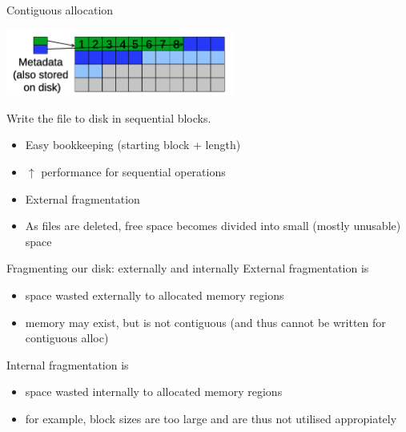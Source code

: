 \documentclass[journal, letterpaper]{IEEEtran}
\begin{document}
\begin{theory}{Contiguous allocation}
    \begin{center}
        \includegraphics[width=7.5cm]{./photos/contig_alloc.png}
    \end{center}
    Write the file to disk in sequential blocks.
    \begin{itemize}
        \item[\ding{51}] Easy bookkeeping (starting block + length)
        \item[\ding{51}] $\uparrow$ performance for sequential operations
        \item[\ding{55}] External fragmentation
        \item[\ding{55}] As files are deleted, free space becomes divided into small (mostly unusable) space
    \end{itemize}
\end{theory}
\begin{aside}{Fragmenting our disk: externally and internally}
    External fragmentation is
    \begin{itemize}
        \item space wasted externally to allocated memory regions
        \item memory may exist, but is not contiguous (and thus cannot be written for contiguous alloc)
    \end{itemize}
    Internal fragmentation is
    \begin{itemize}
        \item space wasted internally to allocated memory regions
        \item for example, block sizes are too large and are thus not utilised appropiately
    \end{itemize}
\end{aside}
\end{document}
